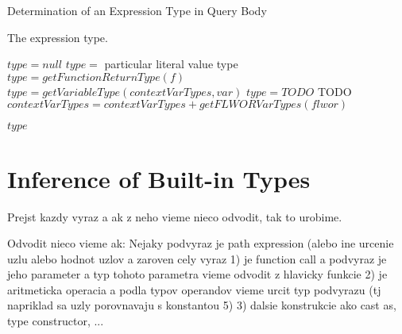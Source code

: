 \begin{algorithm}
\caption{Determination of an Expression Type in Query Body}
\label{ALG_determination_of_an_expression_type_in_query_body}
\begin{algorithmic}[1]
\ENSURE The expression type.

\STATE $type = null$
     \STATE $type =$ particular literal value type
     \STATE $type = getFunctionReturnType(f)$
     \STATE $type = getVariableType(contextVarTypes, var)$
     \STATE $type = TODO$
     \STATE TODO
     \STATE $contextVarTypes = contextVarTypes + getFLWORVarTypes(flwor)$
     \STATE
\ENDIF

\RETURN $type$
\end{algorithmic}
\end{algorithm}




























\section{Inference of Built-in Types}
Prejst kazdy vyraz a ak z neho vieme nieco odvodit, tak to urobime.

Odvodit nieco vieme ak:
Nejaky podvyraz je path expression (alebo ine urcenie uzlu alebo hodnot uzlov 
a zaroven cely vyraz
1) je function call a podvyraz je jeho parameter a typ tohoto parametra vieme odvodit z hlavicky funkcie
2) je aritmeticka operacia a podla typov operandov vieme urcit typ podvyrazu (tj napriklad sa uzly porovnavaju s konstantou 5) 
3) dalsie konstrukcie ako cast as, type constructor, ... 



